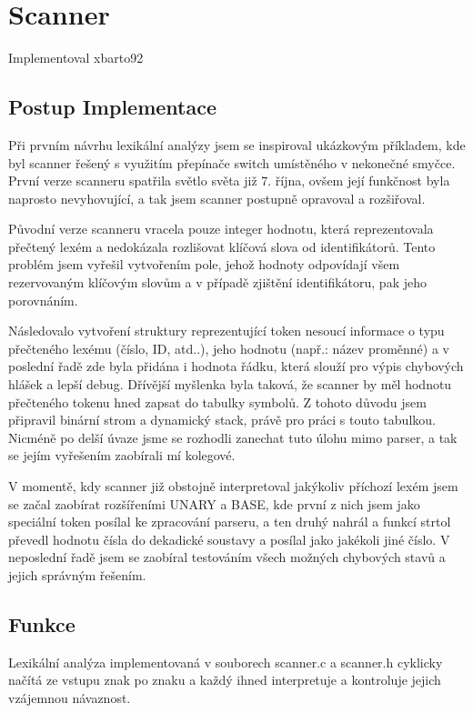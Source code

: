 \documentclass[11pt,a4paper]{article}
\begin{document}
\section{Scanner}
Implementoval xbarto92

	\subsection{Postup Implementace}
	Při prvním návrhu lexikální analýzy jsem se inspiroval ukázkovým příkladem, kde byl scanner řešený s využitím přepínače switch umístěného v nekonečné smyčce. První verze scanneru spatřila světlo světa již 7. října, ovšem její funkčnost byla naprosto nevyhovující, a tak jsem scanner postupně opravoval a rozšiřoval.
	
	Původní verze scanneru vracela pouze integer hodnotu, která reprezentovala přečtený lexém a nedokázala rozlišovat klíčová slova od identifikátorů. Tento problém jsem vyřešil vytvořením pole, jehož hodnoty odpovídají všem rezervovaným klíčovým slovům a v případě zjištění identifikátoru, pak jeho porovnáním.
	
	Následovalo vytvoření struktury reprezentující token nesoucí informace o typu přečteného lexému (číslo, ID, atd..), jeho hodnotu (např.: název proměnné) a v poslední řadě zde byla přidána i hodnota řádku, která slouží pro výpis chybových hlášek a lepší debug. Dřívější myšlenka byla taková, že scanner by měl hodnotu přečteného tokenu hned zapsat do tabulky symbolů. Z tohoto důvodu jsem připravil binární strom a dynamický stack, právě pro práci s touto tabulkou. Nicméně po delší úvaze jsme se rozhodli zanechat tuto úlohu mimo parser, a tak se jejím vyřešením zaobírali mí kolegové.
	
	V momentě, kdy scanner již obstojně interpretoval jakýkoliv příchozí lexém jsem se začal zaobírat rozšířeními UNARY a BASE, kde první z nich jsem jako speciální token posílal ke zpracování parseru, a ten druhý nahrál a funkcí strtol převedl hodnotu čísla do dekadické soustavy a posílal jako jakékoli jiné číslo. V neposlední řadě jsem se zaobíral testováním všech možných chybových stavů a jejich správným řešením.

	\subsection{Funkce}
	Lexikální analýza implementovaná v souborech scanner.c a scanner.h cyklicky načítá ze vstupu znak po znaku a každý ihned interpretuje a kontroluje jejich vzájemnou návaznost.
	
\end{document}
